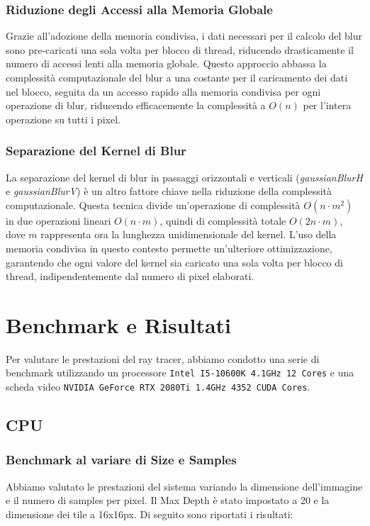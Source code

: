 \documentclass[12pt]{article}
\begin{document}
\subsubsection{Riduzione degli Accessi alla Memoria Globale}
Grazie all'adozione della memoria condivisa, i dati necessari per il calcolo del blur sono pre-caricati una sola volta per blocco di thread, riducendo drasticamente il numero di accessi lenti alla memoria globale. Questo approccio abbassa la complessità computazionale del blur a una costante per il caricamento dei dati nel blocco, seguita da un accesso rapido alla memoria condivisa per ogni operazione di blur, riducendo efficacemente la complessità a \(O(n)\) per l'intera operazione su tutti i pixel.

\subsubsection{Separazione del Kernel di Blur}
La separazione del kernel di blur in passaggi orizzontali e verticali (\textit{gaussianBlurH} e \textit{gaussianBlurV}) è un altro fattore chiave nella riduzione della complessità computazionale. Questa tecnica divide un'operazione di complessità \(O(n \cdot m^2)\) in due operazioni lineari \(O(n \cdot m)\), quindi di complessità totale \(O(2n \cdot m)\), dove \(m\) rappresenta ora la lunghezza unidimensionale del kernel. L'uso della memoria condivisa in questo contesto permette un'ulteriore ottimizzazione, garantendo che ogni valore del kernel sia caricato una sola volta per blocco di thread, indipendentemente dal numero di pixel elaborati.

\newpage


\section{Benchmark e Risultati}
Per valutare le prestazioni del ray tracer, abbiamo condotto una serie di benchmark utilizzando un processore \texttt{Intel I5-10600K 4.1GHz 12 Cores} e una scheda video \texttt{NVIDIA GeForce RTX 2080Ti 1.4GHz 4352 CUDA Cores}.
\subsection{CPU}
\subsubsection{Benchmark al variare di Size e Samples}
Abbiamo valutato le prestazioni del sistema variando la dimensione dell'immagine e il numero di samples per pixel. Il Max Depth è stato impostato a 20 e la dimensione dei tile a 16x16px. Di seguito sono riportati i risultati:
\end{document}
